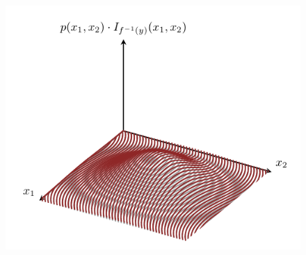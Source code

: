 \documentclass[
  letterpaper,
  DIV=11,
  numbers=noendperiod]{scrartcl}
\begin{document}
\begin{figure}
\begin{minipage}{0.45\linewidth}
{\captionsetup{labelsep=none}\includegraphics{figures/conditional_density_functions/continuous_partition/partitioned_densities/partitioned_densities.pdf}

}

\subcaption{\label{fig-continuous-conditional-partitioned}}

\end{minipage}%
%
\begin{minipage}{0.05\linewidth}
~\end{minipage}%
\newline
\begin{minipage}{0.28\linewidth}
~\end{minipage}%
%
\begin{minipage}{0.45\linewidth}

\end{minipage}
\end{figure}
\end{document}
